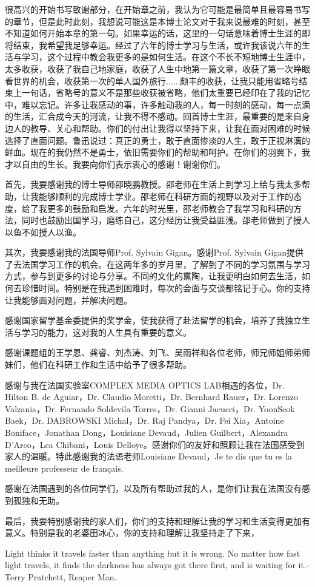 
\begin{thanks}

很高兴的开始书写致谢部分，在开始章之前，我认为它可能是最简单且最容易书写的章节，但是此时此刻，我想说可能这是本博士论文对于我来说最难的时刻，甚至不知道如何开始本章的第一句。如果幸运的话，这里的一句话意味着博士生涯的即将结束，我希望我足够幸运。经过了六年的博士学习与生活，或许我该说六年的生活与学习，这个过程中教会我更多的是如何生活。在这个不长不短地博士生涯中，太多收获，收获了我自己地家庭，收获了人生中地第一篇文章，收获了第一次睁眼看世界的机会，收获第一次的单人国外旅行......颇丰的收获，让我只能用省略号结束上一句话，省略号的意义不是那些收获被省略，他们太重要已经印在了我的记忆中，难以忘记。许多让我感动的事，许多触动我的人，每一时刻的感动，每一点滴的生活，汇合成今天的河流，让我不得不感动。回首博士生涯，最重要的是来自身边人的教导、关心和帮助。你们的付出让我得以坚持下来，让我在面对困难的时候选择了直面问题。鲁迅说过：真正的勇士，敢于直面惨淡的人生，敢于正视淋漓的鲜血。现在的我仍然不是勇士，依旧需要你们的帮助和呵护。在你们的羽翼下，我才以自由的生长。我要向你们表示衷心的感谢！谢谢你们。

首先，我要感谢我的博士导师邵晓鹏教授。邵老师在生活上到学习上给与我太多帮助，让我能够顺利的完成博士学业。邵老师在科研方面的视野以及对于工作的态度，给了我更多的鼓励和启发。六年的时光里，邵老师教会了我学习和科研的方法，同时也鼓励出国学习，磨练自己，这分经历让我受益匪浅。邵老师做到了授人以鱼不如授人以渔。

其次，我要感谢我的法国导师Prof. Sylvain Gigan。感谢Prof. Sylvain Gigan提供了去法国学习工作的机会。在这两年多的岁月里，了解到了不同的学习氛围与学习方式，参与到更多的讨论与分享。不同的文化的熏陶，让我更明白如何去生活，如何去珍惜时间。特别是在我遇到困难时，每次的会面与交谈都铭记于心。你的支持让我能够面对问题，并解决问题。

感谢国家留学基金委提供的奖学金，使我获得了赴法留学的机会，培养了我独立生活与学习的能力，这对我的人生具有重要的意义。

感谢课题组的王学恩、龚睿、刘杰涛、刘飞、吴雨祥和各位老师，师兄师姐师弟师妹们，他们在科研工作和生活中给予了很多帮助。

感谢与我在法国实验室COMPLEX MEDIA OPTICS LAB相遇的各位，Dr. Hilton B. de Aguiar，Dr. Claudio Moretti，Dr. Bernhard Rauer，Dr. Lorenzo Valzania，Dr. Fernando Soldevila Torres，Dr. Gianni Jacucci，Dr. YoonSeok Baek，Dr. DABROWSKI Michal，Dr. Raj Pandya，Dr. Fei Xia，Antoine Boniface，Jonathan Dong，Louisiane Devaud，Julien Guilbert，Alexandra D’Arco，Lea Chibani，Louis Delloye。感谢你们的友好和照顾让我在法国感受到家人的温暖。特此感谢我的法语老师Louisiane Devaud，Je te dis que tu es la meilleure professeur de français.

感谢在法国遇到的各位同学们，以及所有帮助过我的人，是你们让我在法国没有感到孤独和无助。

最后，我要特别感谢我的家人们，你们的支持和理解让我的学习和生活变得更加有意义。特别是我的老婆田冰心，你的支持和理解让我坚持走了下来，

Light thinks it travels faster than anything but it is wrong. No matter how fast light travels, it finds the darkness has always got there first, and is waiting for it.-Terry Pratchett, Reaper Man.
\end{thanks}
